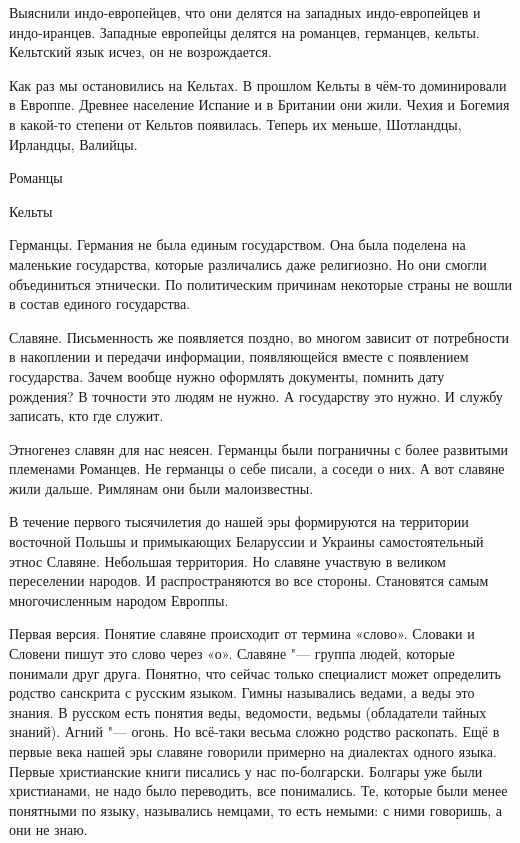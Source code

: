 Выяснили индо-европейцев, что они делятся на западных индо-европейцев и индо-иранцев. Западные европейцы делятся на романцев, германцев, кельты. Кельтский язык исчез, он не возрождается.

Как раз мы остановились на Кельтах. В прошлом Кельты в чём-то доминировали в Европпе. Древнее население Испание и в Британии они жили. Чехия и Богемия в какой-то степени от Кельтов появилась. Теперь их меньше, Шотландцы, Ирландцы, Валийцы. 

\begin{azItems}
 \item Романцы
 \item Кельты
 \item Германцы. Германия не была единым государством. Она была поделена на маленькие государства, которые различались даже религиозно. Но они смогли объединиться этнически. По политическим причинам некоторые страны не вошли в состав единого государства.
\item Славяне. Письменность же появляется поздно, во многом зависит от потребности в накоплении и передачи информации, появляющейся вместе с появлением государства. Зачем вообще нужно оформлять документы, помнить дату рождения? В точности это людям не нужно. А государству это нужно. И службу записать, кто где служит.

Этногенез славян для нас неясен. Германцы были пограничны с более развитыми племенами Романцев. Не германцы о себе писали, а соседи о них. А вот славяне жили дальше. Римлянам они были малоизвестны.

В течение первого тысячилетия до нашей эры формируются на территории восточной Польшы и примыкающих Беларуссии и Украины самостоятельный этнос Славяне. Небольшая территория. Но славяне участвую в великом переселении народов. И распространяются во все стороны. Становятся самым многочисленным народом Европпы.

Первая версия. Понятие славяне происходит от термина «слово». Словаки и Словени пишут это слово через «о». Славяне "--- группа людей, которые понимали друг друга. Понятно, что сейчас только специалист может определить родство санскрита с русским языком. Гимны назывались ведами, а веды это знания. В русском есть понятия веды, ведомости, ведьмы (обладатели тайных знаний). Агний "--- огонь. Но всё-таки весьма сложно родство раскопать. Ещё в первые века нашей эры славяне говорили примерно на диалектах одного языка. Первые христианские книги писались у нас по-болгарски. Болгары уже были христианами, не надо было переводить, все понимались. Те, которые были менее понятными по языку, назывались немцами, то есть немыми: с ними говоришь, а они не знаю.


\end{azItems}
